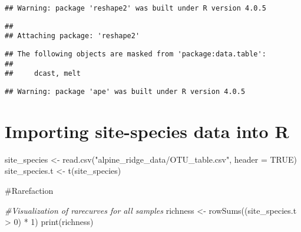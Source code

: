 \documentclass[
]{article}
\newenvironment{Shaded}{\begin{snugshade}}{\end{snugshade}}
\newcommand{\AttributeTok}[1]{\textcolor[rgb]{0.77,0.63,0.00}{#1}}
\newcommand{\CommentTok}[1]{\textcolor[rgb]{0.56,0.35,0.01}{\textit{#1}}}
\newcommand{\ConstantTok}[1]{\textcolor[rgb]{0.00,0.00,0.00}{#1}}
\newcommand{\DecValTok}[1]{\textcolor[rgb]{0.00,0.00,0.81}{#1}}
\newcommand{\FunctionTok}[1]{\textcolor[rgb]{0.00,0.00,0.00}{#1}}
\newcommand{\NormalTok}[1]{#1}
\newcommand{\OtherTok}[1]{\textcolor[rgb]{0.56,0.35,0.01}{#1}}
\newcommand{\SpecialCharTok}[1]{\textcolor[rgb]{0.00,0.00,0.00}{#1}}
\newcommand{\StringTok}[1]{\textcolor[rgb]{0.31,0.60,0.02}{#1}}
\begin{document}
\begin{verbatim}
## Warning: package 'reshape2' was built under R version 4.0.5
\end{verbatim}

\begin{verbatim}
## 
## Attaching package: 'reshape2'
\end{verbatim}

\begin{verbatim}
## The following objects are masked from 'package:data.table':
## 
##     dcast, melt
\end{verbatim}

\begin{verbatim}
## Warning: package 'ape' was built under R version 4.0.5
\end{verbatim}

\hypertarget{importing-site-species-data-into-r}{%
\section{Importing site-species data into
R}\label{importing-site-species-data-into-r}}

\begin{Shaded}
\begin{Highlighting}[]
\NormalTok{site\_species }\OtherTok{\textless{}{-}} \FunctionTok{read.csv}\NormalTok{(}\StringTok{"alpine\_ridge\_data/OTU\_table.csv"}\NormalTok{, }\AttributeTok{header =} \ConstantTok{TRUE}\NormalTok{)}
\NormalTok{site\_species.t }\OtherTok{\textless{}{-}} \FunctionTok{t}\NormalTok{(site\_species)}
\end{Highlighting}
\end{Shaded}

\#Rarefaction

\begin{Shaded}
\begin{Highlighting}[]
\CommentTok{\#Visualization of rarecurves for all samples}
\NormalTok{richness }\OtherTok{\textless{}{-}} \FunctionTok{rowSums}\NormalTok{((site\_species.t }\SpecialCharTok{\textgreater{}} \DecValTok{0}\NormalTok{) }\SpecialCharTok{*} \DecValTok{1}\NormalTok{)}
\FunctionTok{print}\NormalTok{(richness)}
\end{Highlighting}
\end{Shaded}
\end{document}
